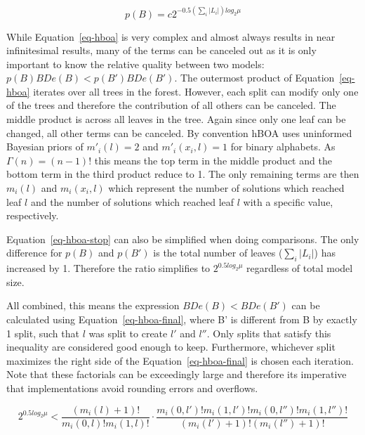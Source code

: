 \documentclass[twoside]{article}
\begin{document}
\begin{equation}
  p(B) = c2^{-0.5(\sum_i|L_i|)log_2\mu}
  \label{eq-hboa-stop}
\end{equation}

While Equation~\ref{eq-hboa} is very complex and almost always results in near infinitesimal results, many
of the terms can be canceled out as it is only important to know the relative quality between two models:
$p(B)BDe(B) < p(B')BDe(B')$.
The outermost product of Equation~\ref{eq-hboa} iterates over all trees in the forest. However, each split
can modify only one of the trees and therefore the contribution of all others can be canceled. The middle
product is across all leaves in the tree. Again since only one leaf can be changed, all other terms can
be canceled. By convention hBOA uses uninformed Bayesian priors of $m'_i(l)= 2$ and $m'_i(x_i, l)=1$ for
binary alphabets. As $\Gamma(n) = (n-1)!$ this means the top term in the middle product and the bottom
term in the third product reduce to 1. The only remaining terms are then $m_i(l)$ and $m_i(x_i, l)$ which
represent the number of solutions which reached leaf $l$ and the number of solutions which reached leaf $l$
with a specific value, respectively.

Equation~\ref{eq-hboa-stop} can also be simplified when doing comparisons. The only difference for $p(B)$ and $p(B')$ is the total
number of leaves ($\sum_i|L_i|$) has increased by 1. Therefore the ratio simplifies to $2^{0.5 log_2\mu}$ regardless of
total model size.

All combined, this means the expression $BDe(B) < BDe(B')$ can be calculated using Equation~\ref{eq-hboa-final},
where B' is different from B by exactly 1 split, such that $l$ was split to create $l'$ and $l''$. Only splits that
satisfy this inequality are considered good enough to keep. Furthermore, whichever split maximizes the right side of the
Equation~\ref{eq-hboa-final} is chosen each iteration. Note that these factorials can be exceedingly large and
therefore its imperative that implementations avoid rounding errors and overflows.

\begin{equation}
  2^{0.5 log_2\mu} < \frac{(m_i(l) + 1)!}{m_i(0, l)!m_i(1,l)!} \cdot
  \frac{m_i(0, l')!m_i(1,l')!m_i(0, l'')!m_i(1,l'')!}{(m_i(l') + 1)!(m_i(l'') + 1)!}
  \label{eq-hboa-final}
\end{equation}
\end{document}
